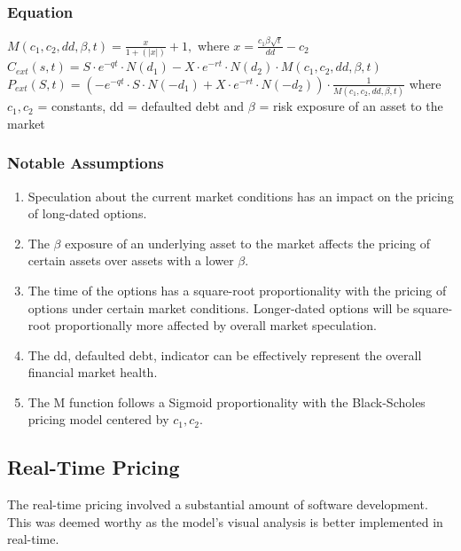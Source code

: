 \documentclass{article}
\begin{document}
\subsubsection{Equation}
$M(c_1, c_2, dd, \beta, t) = \frac{x}{1+ (|x|)} + 1,$ where $x = \frac{c_1\beta\sqrt{t}}{dd} - c_2$
\newline\newline
$C_{ext}(s,t) = S \cdot e^{-qt}  \cdot N (d_1) - X\cdot e^{-rt} \cdot N(d_2) \cdot M(c_1, c_2,dd, \beta, t)$
\newline \newline
$P_{ext}(S,t) = (-e^{-qt}  \cdot  S \cdot N (-d_1) + X\cdot e^{-rt} \cdot N(-d_2)) \cdot \frac{1}{M(c_1, c_2,dd, \beta, t)}$
\newline \newline
where $c_1, c_2$ = constants, dd = defaulted debt and $\beta$ = risk exposure of an asset to the market
\newline
\subsubsection {Notable Assumptions}
\begin{flushleft}  
\begin{enumerate}
\item  Speculation about the current market conditions has an impact on the pricing of long-dated options. 
\item The $\beta$ exposure of an underlying asset to the market affects the pricing of certain assets over assets with a lower $\beta$. 
\item The time of the options has a square-root proportionality with the pricing of options under certain market conditions. Longer-dated options will be square-root proportionally more affected by overall market speculation. 
\item The dd, defaulted debt, indicator can be effectively represent the overall financial market health. 
\item The M function follows a Sigmoid proportionality with the Black-Scholes pricing model centered by $c_1, c_2$. 
\end{enumerate}
\end{flushleft}

\subsection {Real-Time Pricing}
\begin{flushleft} 
The real-time pricing involved a substantial amount of software development. This was deemed worthy as the model's visual analysis is better implemented in real-time. 
\end{flushleft}
\end{document}
